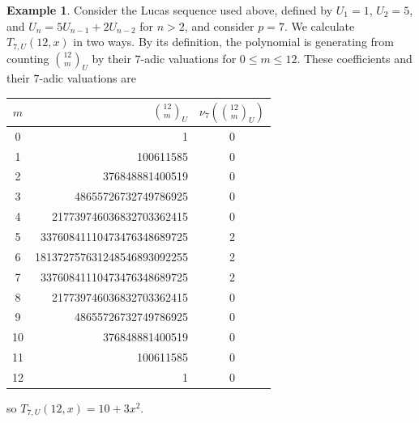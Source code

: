 \documentclass{amsart}
\theoremstyle{definition}
\newtheorem*{example*}{Example}
\begin{document}
\begin{example*}
    Consider the Lucas sequence used above, defined by $U_1=1$, $U_2=5$, and $U_n=5U_{n-1}+2U_{n-2}$ for $n > 2$, and consider $p=7$. We calculate 
    $T_{7, U}(12,x)$ 
    in two ways. By its definition, the polynomial is generating from counting 
    $\binom{12}{m}_U$ 
    by their $7$-adic valuations for 
    $0 \leq m \leq 12$. 
    These coefficients and their $7$-adic valuations are \begin{center} 
    \begin{tabular}{c|r|c}
    $m$ & $\binom{12}{m}_U$ & $\nu_7\!\left(\binom{12}{m}_U\right)$ \\
    \hline
    0  & 1                                          & 0 \\
    1  & 100611585                                  & 0 \\
    2  & 376848881400519                            & 0 \\
    3  & 48655726732749786925                       & 0 \\
    4  & 217739746036832703362415                   & 0 \\
    5  & 33760841110473476348689725                 & 2 \\
    6  & 181372757631248546893092255                & 2 \\
    7  & 33760841110473476348689725                 & 2 \\
    8  & 217739746036832703362415                   & 0 \\
    9  & 48655726732749786925                       & 0 \\
    10 & 376848881400519                            & 0 \\
    11 & 100611585                                  & 0 \\
    12 & 1                                          & 0 \\
    \end{tabular}
    \end{center}
so $T_{7,U}(12,x)=10+3x^2$. 


\end{example*}
\end{document}
